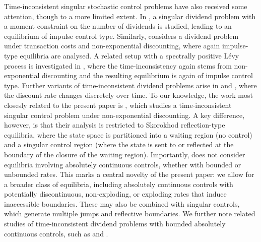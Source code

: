 \documentclass[11pt]{article} %
\numberwithin{komcounter}{section}
\begin{document}
Time-inconsistent singular stochastic control problems have also received some attention, though to a more limited extent. 
In \cite{christensen2022moment}, a singular dividend problem with a moment constraint on the number of dividends is studied, leading to an equilibrium of impulse control type. 
Similarly, \cite{doi:10.1137/16M1088983} considers a dividend problem under transaction costs and non-exponential discounting, where again impulse-type equilibria are analysed. 
A related setup with a spectrally positive L\'evy process is investigated in \cite{Levytimeinc}, where the time-inconsistency again stems from non-exponential discounting and the resulting equilibrium is again of impulse control type.
Further variants of time-inconsistent dividend problems arise in \cite{CHEN2014150} and \cite{zhu2020singular}, where the discount rate changes discretely over time.
To our knowledge, the work most closesly related to the present paper is \cite{liang2024equilibria}, which studies a time-inconsistent singular control problem under non-exponential discounting. 
A key difference, however, is that their analysis is restricted to Skorokhod reflection-type equilibria, where the state space is partitioned into a waiting region (no control) and a singular control region (where the state is sent to or reflected at the boundary of the closure of the waiting region). 
Importantly, \cite{liang2024equilibria} does not consider equilibria involving absolutely continuous controls, whether with bounded or unbounded rates. 
This marks a central novelty of the present paper: we allow for a broader class of equilibria, including absolutely continuous controls with potentially discontinuous, non-exploding, or exploding rates that induce inaccessible boundaries. 
These may also be combined with singular controls, which generate multiple jumps and reflective boundaries. 
We further note related studies of time-inconsistent dividend problems with bounded absolutely continuous controls, such as \cite{strini2023time} and \cite{zhao2014dividend}.
\end{document}
